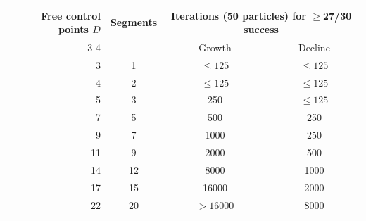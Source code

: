 \begin{tabular}{rccc}
\toprule
Free control points $D$ & Segments & \multicolumn{2}{c}{Iterations (50 particles) for $\geq$27/30 success}\\
\cmidrule(lr){3-4}
 & & Growth & Decline\\
\midrule
3 & 1 & $\leq125$ & $\leq125$\\
4 & 2 & $\leq125$ & $\leq125$\\
5 & 3 & 250 & $\leq125$\\
7 & 5 & 500 & 250\\
9 & 7 & 1000 & 250\\
11 & 9 & 2000 & 500\\
14 & 12 & 8000 & 1000\\
17 & 15 & 16000 & 2000\\
22 & 20 & $>16000$ & 8000\\
\bottomrule
\end{tabular}